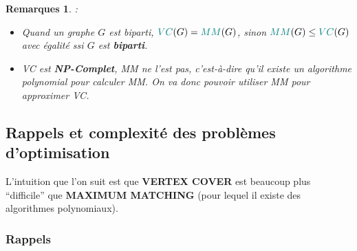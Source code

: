 \documentclass{article}
\newcommand{\titre}[1]{\textcolor{title}{#1}}
\newtheorem{rems}{Remarques}[section]
\begin{document}
\begin{sffamily}
\begin{rems} :
\begin{itemize}
\item Quand un graphe $G$ est biparti, $\titre{VC}(G) = \titre{MM}(G)$, sinon $\titre{MM}(G) \leq \titre{VC}(G)$ avec égalité 
ssi $G$ est \textbf{biparti}.
\item \titre{VC} est \textbf{NP-Complet}, \titre{MM} ne l'est pas, c'est-à-dire qu'il existe un algorithme polynomial pour 
calculer \titre{MM}. On va donc pouvoir utiliser \titre{MM} pour approximer \titre{VC}.
\end{itemize}
\end{rems}

\subsection{Rappels et complexité des problèmes d'optimisation}

L'intuition que l'on suit est que \textbf{VERTEX COVER} est beaucoup plus ``difficile'' que \textbf{MAXIMUM MATCHING} (pour lequel il 
existe des algorithmes polynomiaux).

\subsubsection*{Rappels}


\end{sffamily}
\end{document}
